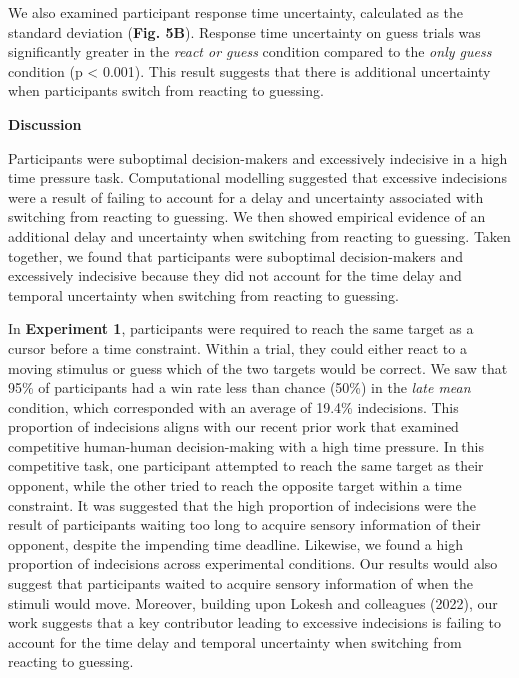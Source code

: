\documentclass[12pt]{article}
\newcommand\boldblue[1]{\textcolor{mydarkblue}{\textbf{#1}}}
\newcommand{\SectionHeader}[1]{\noindent\boldblue{\Large{#1}}\normalsize }
\begin{document}
\noindent We also examined participant response time uncertainty, calculated as the standard deviation (\boldblue{Fig. 5B}). Response time uncertainty on guess trials was significantly greater in the \emph{react or guess} condition compared to the \emph{only guess} condition (p < 0.001). This result suggests that there is additional uncertainty when participants switch from reacting to guessing.

\vspace{2mm}
\SectionHeader{Discussion}

\noindent Participants were suboptimal decision-makers and excessively indecisive in a high time pressure task. Computational modelling suggested that excessive indecisions were a result of failing to account for a delay and uncertainty associated with switching from reacting to guessing. We then showed empirical evidence of an additional delay and uncertainty when switching from reacting to guessing. Taken together, we found that participants were suboptimal decision-makers and excessively indecisive because they did not account for the time delay and temporal uncertainty when switching from reacting to guessing.

In \boldblue{Experiment 1}, participants were required to reach the same target as a cursor before a time constraint. Within a trial, they could either react to a moving stimulus or guess which of the two targets would be correct. We saw that 95\% of participants had a win rate less than chance (50\%) in the \emph{late mean} condition, which corresponded with an average of 19.4\% indecisions. This proportion of indecisions aligns with our recent prior work that examined competitive human-human decision-making with a high time pressure\autocite{lokeshHumansUtilizeSensory2022}. In this competitive task, one participant attempted to reach the same target as their opponent, while the other tried to reach the opposite target within a time constraint. It was suggested that the high proportion of indecisions were the result of participants waiting too long to acquire sensory information of their opponent, despite the impending time deadline. Likewise, we found a high proportion of indecisions across experimental conditions. Our results would also suggest that participants waited to acquire sensory information of when the stimuli would move. Moreover, building upon Lokesh and colleagues (2022), our work suggests that a key contributor leading to excessive indecisions is failing to account for the time delay and temporal uncertainty when switching from reacting to guessing.
\end{document}
